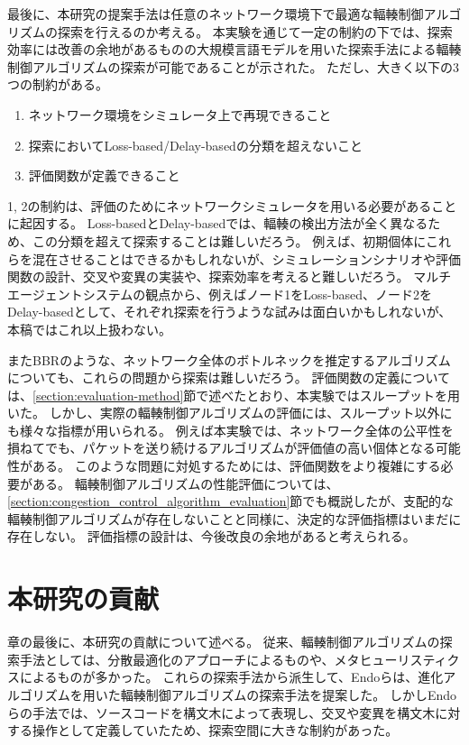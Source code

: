 \documentclass[a4paper,11pt]{jreport}
\newcommand{\secref}[1]{\ref{#1}節}
\begin{document}
最後に、本研究の提案手法は任意のネットワーク環境下で最適な輻輳制御アルゴリズムの探索を行えるのか考える。
本実験を通じて一定の制約の下では、探索効率には改善の余地があるものの大規模言語モデルを用いた探索手法による輻輳制御アルゴリズムの探索が可能であることが示された。
ただし、大きく以下の3つの制約がある。
\begin{enumerate}
  \item ネットワーク環境をシミュレータ上で再現できること
  \item 探索においてLoss-based/Delay-basedの分類を超えないこと
  \item 評価関数が定義できること
\end{enumerate}
1, 2の制約は、評価のためにネットワークシミュレータを用いる必要があることに起因する。
Loss-basedとDelay-basedでは、輻輳の検出方法が全く異なるため、この分類を超えて探索することは難しいだろう。
例えば、初期個体にこれらを混在させることはできるかもしれないが、シミュレーションシナリオや評価関数の設計、交叉や変異の実装や、探索効率を考えると難しいだろう。
マルチエージェントシステムの観点から、例えばノード1をLoss-based、ノード2をDelay-basedとして、それぞれ探索を行うような試みは面白いかもしれないが、本稿ではこれ以上扱わない。

またBBRのような、ネットワーク全体のボトルネックを推定するアルゴリズムについても、これらの問題から探索は難しいだろう。
評価関数の定義については、\secref{section:evaluation-method}で述べたとおり、本実験ではスループットを用いた。
しかし、実際の輻輳制御アルゴリズムの評価には、スループット以外にも様々な指標が用いられる。
例えば本実験では、ネットワーク全体の公平性を損ねてでも、パケットを送り続けるアルゴリズムが評価値の高い個体となる可能性がある。
このような問題に対処するためには、評価関数をより複雑にする必要がある。
輻輳制御アルゴリズムの性能評価については、\secref{section:congestion_control_algorithm_evaluation}でも概説したが、支配的な輻輳制御アルゴリズムが存在しないことと同様に、決定的な評価指標はいまだに存在しない。
評価指標の設計は、今後改良の余地があると考えられる。

\section{本研究の貢献}
\label{section:contribution}

章の最後に、本研究の貢献について述べる。
従来、輻輳制御アルゴリズムの探索手法としては、分散最適化のアプローチによるものや、メタヒューリスティクスによるものが多かった。
これらの探索手法から派生して、Endoら\cite{endo-2022-toward}は、進化アルゴリズムを用いた輻輳制御アルゴリズムの探索手法を提案した。
しかしEndoらの手法では、ソースコードを構文木によって表現し、交叉や変異を構文木に対する操作として定義していたため、探索空間に大きな制約があった。
\end{document}
